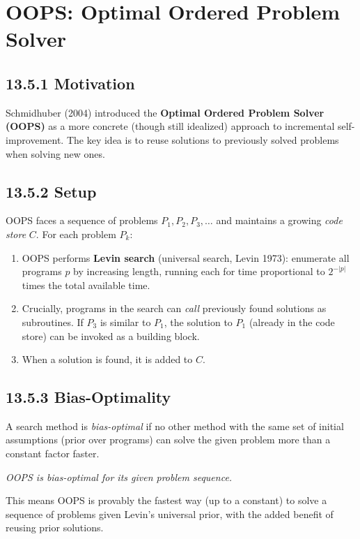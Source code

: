 \section{OOPS: Optimal Ordered Problem Solver}

\subsection{13.5.1 Motivation}

Schmidhuber (2004) introduced the \textbf{Optimal Ordered Problem Solver (OOPS)} as a more concrete (though still idealized) approach to incremental self-improvement. The key idea is to reuse solutions to previously solved problems when solving new ones.

\subsection{13.5.2 Setup}

OOPS faces a sequence of problems $P_1, P_2, P_3, \ldots$ and maintains a growing \textit{code store} $C$. For each problem $P_k$:

\begin{enumerate}
\item OOPS performs \textbf{Levin search} (universal search, Levin 1973): enumerate all programs $p$ by increasing length, running each for time proportional to $2^{-|p|}$ times the total available time.
\item Crucially, programs in the search can \textit{call} previously found solutions as subroutines. If $P_3$ is similar to $P_1$, the solution to $P_1$ (already in the code store) can be invoked as a building block.
\item When a solution is found, it is added to $C$.
\end{enumerate}

\subsection{13.5.3 Bias-Optimality}

\begin{definition}
A search method is \textit{bias-optimal} if no other method with the same set of initial assumptions (prior over programs) can solve the given problem more than a constant factor faster.
\end{definition}

\begin{theorem}[Schmidhuber 2004]
\textit{OOPS is bias-optimal for its given problem sequence.}

This means OOPS is provably the fastest way (up to a constant) to solve a sequence of problems given Levin's universal prior, with the added benefit of reusing prior solutions.
\end{theorem}

